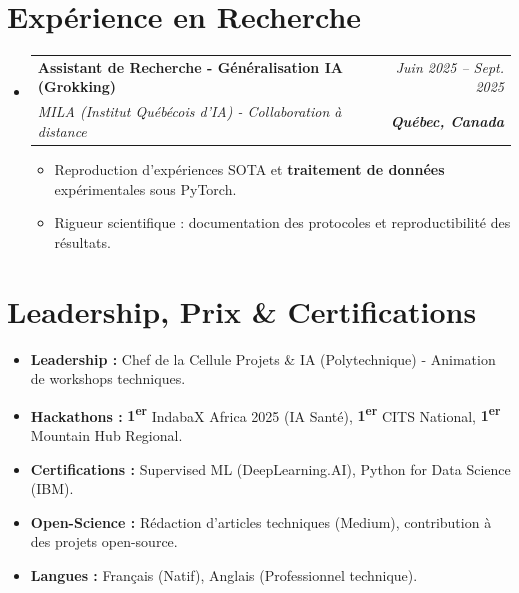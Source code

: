 \documentclass[a4paper,11pt]{article}
\makeatletter
\newcommand{\resumeSubheading}[4]{
  \vspace{-1pt}\item
    \begin{tabular*}{0.97\textwidth}[t]{l@{\extracolsep{\fill}}r}
      \textbf{#1} & \textit{\small #2} \\
      \textit{\small #3} & \textit{\small #4} \\
    \end{tabular*}\vspace{-5pt}
}
\makeatother
\begin{document}
\section{Expérience en Recherche}
\begin{itemize}[leftmargin=*, label={-}]

    \resumeSubheading
      {Assistant de Recherche - Généralisation IA (Grokking)}{Juin 2025 -- Sept. 2025}
      {MILA (Institut Québécois d'IA) - Collaboration à distance}{\textbf{Québec, Canada}}
      \begin{itemize}[leftmargin=0.4cm, nosep, label=\tiny$\bullet$]
        \item \small{Reproduction d'expériences SOTA et \textbf{traitement de données} expérimentales sous PyTorch.}
        \item \small{Rigueur scientifique : documentation des protocoles et reproductibilité des résultats.}
      \end{itemize}

\end{itemize}

\section{Leadership, Prix \& Certifications}
\begin{itemize}[leftmargin=*, nosep]
    \item \textbf{Leadership :} Chef de la Cellule Projets \& IA (Polytechnique) - Animation de workshops techniques.
    \item \textbf{Hackathons :} \textbf{1\textsuperscript{er}} IndabaX Africa 2025 (IA Santé), \textbf{1\textsuperscript{er}} CITS National, \textbf{1\textsuperscript{er}} Mountain Hub Regional.
    \item \textbf{Certifications :} Supervised ML (DeepLearning.AI), Python for Data Science (IBM).
    \item \textbf{Open-Science :} Rédaction d'articles techniques (Medium), contribution à des projets open-source.
    \item \textbf{Langues :} Français (Natif), Anglais (Professionnel technique).
\end{itemize}
\end{document}
